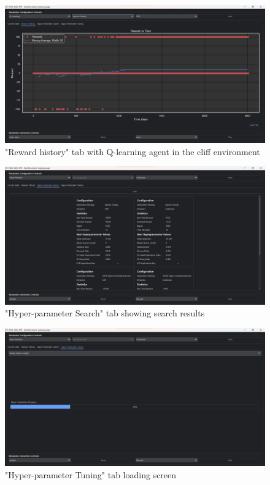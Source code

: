 \documentclass[]{final_report}
\begin{document}
\begin{figure}[H]
  \centering
  
  \includegraphics[trim={0 0 0 6mm},clip,width=\textwidth]{ui-screenshots/reward-history.png}
  
  \caption{\label{fig:screenshot:current-state} "Reward history" tab with Q-learning agent in the cliff environment}
\end{figure}

\begin{figure}[H]
  \centering
  
  \includegraphics[trim={0 0 0 6mm},clip,width=\textwidth]{ui-screenshots/random-search.png}
  
  \caption{\label{fig:screenshot:current-state} "Hyper-parameter Search" tab showing search results}
\end{figure}


\begin{figure}[H]
  \centering
  
  \includegraphics[trim={0 0 0 6mm},clip,width=\textwidth]{ui-screenshots/loading-screen.png}
  
  \caption{\label{fig:screenshot:current-state} "Hyper-parameter Tuning" tab loading screen}
\end{figure}
\end{document}
